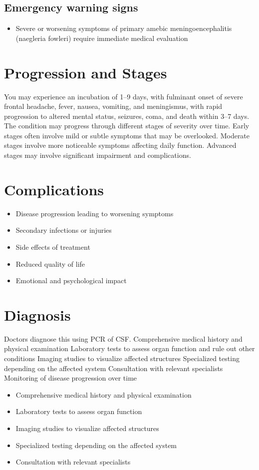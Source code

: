 \subsection{Emergency warning signs}
\begin{itemize}[noitemsep]
  \item Severe or worsening symptoms of primary amebic meningoencephalitis (naegleria fowleri) require immediate medical evaluation
\end{itemize}
\section{Progression and Stages}
You may experience an incubation of 1--9 days, with fulminant onset of severe frontal headache, fever, nausea, vomiting, and meningismus, with rapid progression to altered mental status, seizures, coma, and death within 3--7 days. The condition may progress through different stages of severity over time. Early stages often involve mild or subtle symptoms that may be overlooked. Moderate stages involve more noticeable symptoms affecting daily function. Advanced stages may involve significant impairment and complications.
\section{Complications}
\begin{itemize}[noitemsep]
  \item Disease progression leading to worsening symptoms
  \item Secondary infections or injuries
  \item Side effects of treatment
  \item Reduced quality of life
  \item Emotional and psychological impact
\end{itemize}
\section{Diagnosis}
Doctors diagnose this using PCR of CSF. Comprehensive medical history and physical examination Laboratory tests to assess organ function and rule out other conditions Imaging studies to visualize affected structures Specialized testing depending on the affected system Consultation with relevant specialists Monitoring of disease progression over time

\begin{itemize}[noitemsep]
  \item Comprehensive medical history and physical examination
  \item Laboratory tests to assess organ function
  \item Imaging studies to visualize affected structures
  \item Specialized testing depending on the affected system
  \item Consultation with relevant specialists
\end{itemize}
